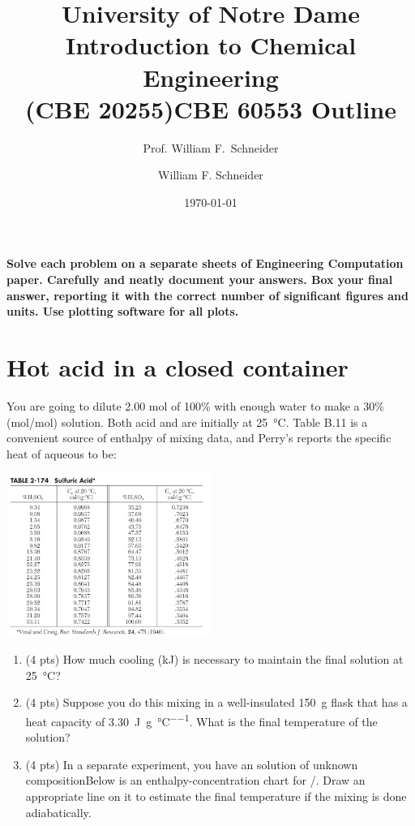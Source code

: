\documentclass[11pt]{article}
\title{University of Notre Dame\\Introduction to Chemical Engineering\\(CBE 20255)}
\author{Prof. William F.\ Schneider}
\author{William F. Schneider}
\date{\today}
\title{CBE 60553 Outline}
\begin{document}
\begin{options}
\end{options}

\noindent \textbf{Solve each problem on a separate sheets of Engineering Computation paper.  Carefully and neatly document your answers. Box your final answer, reporting it with the correct number of significant figures and units.  Use plotting software for all plots.}


\section{Hot acid in a closed container}
\label{sec-1}
You are going to dilute 2.00 mol of 100\%  with enough water to make a 30\%(mol/mol) solution.  Both acid and  are initially at \SI{25}{\celsius}. Table B.11 is a convenient source of enthalpy of mixing data, and Perry's reports the specific heat of aqueous  to be:

\begin{center}
\includegraphics[width=0.5\textwidth]{../../figs/H2SO4-Cp.png}
\end{center}

\begin{enumerate}
\item (4 pts) How much cooling (kJ) is necessary to maintain the final solution at \SI{25}{\celsius}?
\item (4 pts) Suppose you do this mixing in a well-insulated \SI{150}{\gram} flask that has a heat capacity of \SI{3.30}{\joule\per\gram\per\celsius}.  What is the final temperature of the solution?
\item (4 pts) In a separate experiment, you have an  solution of unknown compositionBelow is an enthalpy-concentration chart for /.  Draw an appropriate line on it to estimate the final temperature if the mixing is done adiabatically.
\end{enumerate}
\end{document}
